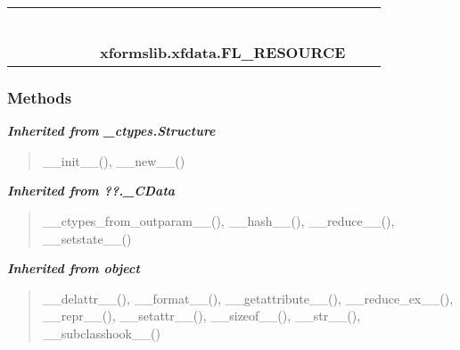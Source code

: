     \label{xformslib:xfdata:FL_RESOURCE}
\begin{tabular}{cccccccccc}
\multicolumn{2}{r}{\settowidth{\BCL}{object}\multirow{2}{\BCL}{object}}
&&
&&
&&
  \\\cline{3-3}
  &&\multicolumn{1}{c|}{}
&&
&&
&&
  \\
\multicolumn{4}{r}{\settowidth{\BCL}{??.\_CData}\multirow{2}{\BCL}{??.\_CData}}
&&
&&
  \\\cline{5-5}
  &&&&\multicolumn{1}{c|}{}
&&
&&
  \\
\multicolumn{6}{r}{\settowidth{\BCL}{\_ctypes.Structure}\multirow{2}{\BCL}{\_ctypes.Structure}}
&&
  \\\cline{7-7}
  &&&&&&\multicolumn{1}{c|}{}
&&
  \\
&&&&&&\multicolumn{2}{l}{\textbf{xformslib.xfdata.FL\_RESOURCE}}
\end{tabular}



  \subsubsection{Methods}


\large{\textbf{\textit{Inherited from \_ctypes.Structure}}}

\begin{quote}
\_\_init\_\_(), \_\_new\_\_()
\end{quote}

\large{\textbf{\textit{Inherited from ??.\_CData}}}

\begin{quote}
\_\_ctypes\_from\_outparam\_\_(), \_\_hash\_\_(), \_\_reduce\_\_(), \_\_setstate\_\_()
\end{quote}

\large{\textbf{\textit{Inherited from object}}}

\begin{quote}
\_\_delattr\_\_(), \_\_format\_\_(), \_\_getattribute\_\_(), \_\_reduce\_ex\_\_(), \_\_repr\_\_(), \_\_setattr\_\_(), \_\_sizeof\_\_(), \_\_str\_\_(), \_\_subclasshook\_\_()
\end{quote}


